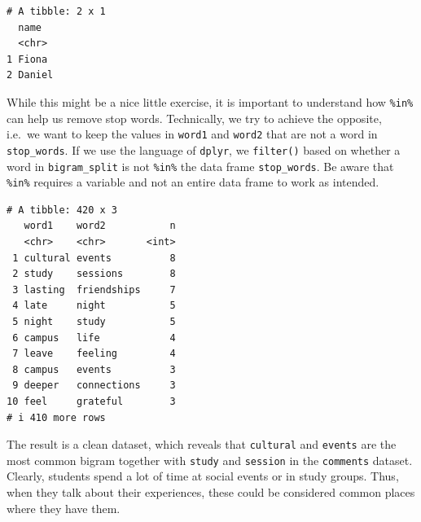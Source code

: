 \documentclass[
  letterpaper,
  DIV=11,
  numbers=noendperiod]{scrreprt}
\newenvironment{Shaded}{\begin{snugshade}}{\end{snugshade}}
\newcommand{\AttributeTok}[1]{\textcolor[rgb]{0.40,0.45,0.13}{#1}}
\newcommand{\ConstantTok}[1]{\textcolor[rgb]{0.56,0.35,0.01}{#1}}
\newcommand{\FunctionTok}[1]{\textcolor[rgb]{0.28,0.35,0.67}{#1}}
\newcommand{\NormalTok}[1]{\textcolor[rgb]{0.00,0.23,0.31}{#1}}
\newcommand{\OtherTok}[1]{\textcolor[rgb]{0.00,0.23,0.31}{#1}}
\newcommand{\SpecialCharTok}[1]{\textcolor[rgb]{0.37,0.37,0.37}{#1}}
\begin{document}
\begin{verbatim}
# A tibble: 2 x 1
  name  
  <chr> 
1 Fiona 
2 Daniel
\end{verbatim}

While this might be a nice little exercise, it is important to
understand how \texttt{\%in\%} can help us remove stop words.
Technically, we try to achieve the opposite, i.e.~we want to keep the
values in \texttt{word1} and \texttt{word2} that are not a word in
\texttt{stop\_words}. If we use the language of \texttt{dplyr}, we
\texttt{filter()} based on whether a word in \texttt{bigram\_split} is
not \texttt{\%in\%} the data frame \texttt{stop\_words}. Be aware that
\texttt{\%in\%} requires a variable and not an entire data frame to work
as intended.

\begin{Shaded}
\end{Shaded}

\begin{verbatim}
# A tibble: 420 x 3
   word1    word2           n
   <chr>    <chr>       <int>
 1 cultural events          8
 2 study    sessions        8
 3 lasting  friendships     7
 4 late     night           5
 5 night    study           5
 6 campus   life            4
 7 leave    feeling         4
 8 campus   events          3
 9 deeper   connections     3
10 feel     grateful        3
# i 410 more rows
\end{verbatim}

The result is a clean dataset, which reveals that \texttt{cultural} and
\texttt{events} are the most common bigram together with \texttt{study}
and \texttt{session} in the \texttt{comments} dataset. Clearly, students
spend a lot of time at social events or in study groups. Thus, when they
talk about their experiences, these could be considered common places
where they have them.
\end{document}

